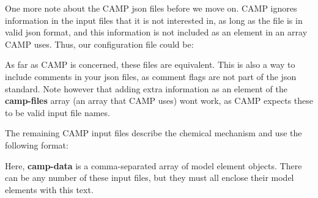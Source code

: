 One more note about the CAMP {\ttfamily json} files before we move on. CAMP ignores information in the input files that it is not interested in, as long as the file is in valid {\ttfamily json} format, and this information is not included as an element in an array CAMP uses. Thus, our configuration file could be\+: 
\begin{DoxyCode}{0}
\DoxyCodeLine{\{}
\DoxyCodeLine{\ \ "{}camp-\/files"{}\ :\ [}
\DoxyCodeLine{\ \ ],}
\DoxyCodeLine{\ \ "{}change\ log"{}\ :\ [}
\DoxyCodeLine{\ \ ]}
\DoxyCodeLine{\}}

\end{DoxyCode}
 As far as CAMP is concerned, these files are equivalent. This is also a way to include comments in your {\ttfamily json} files, as comment flags are not part of the {\ttfamily json} standard. Note however that adding extra information as an element of the {\bfseries{camp-\/files}} array (an array that CAMP uses) won\textquotesingle{}t work, as CAMP expects these to be valid input file names.

The remaining CAMP input files describe the chemical mechanism and use the following format\+: 
\begin{DoxyCode}{0}
\DoxyCodeLine{\{}
\DoxyCodeLine{\ \ "{}camp-\/data"{}\ :\ [}
\DoxyCodeLine{}
\DoxyCodeLine{}
\DoxyCodeLine{\ \ ]}
\DoxyCodeLine{\}}

\end{DoxyCode}
 Here, {\bfseries{camp-\/data}} is a comma-\/separated array of model element objects. There can be any number of these input files, but they must all enclose their model elements with this text.

